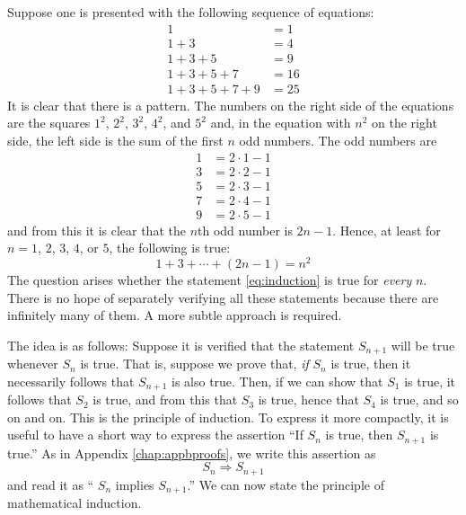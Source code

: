 
Suppose one is presented with the following sequence of equations:
\begin{align*}
1 &=1 \\
1 + 3 &=4 \\
1 + 3 + 5 &=9 \\
1 + 3 + 5 + 7 &=16 \\
1 + 3 + 5 + 7 + 9 &=25 
\end{align*}
It is clear that there is a pattern. The numbers on the right side of the equations are the squares $1^{2}$, $2^{2}$, $3^{2}$, $4^{2}$, and $5^{2}$ and, in the equation with $n^{2}$ on the right side, the left side is the sum of the first $n$ odd numbers. The odd numbers are
\begin{align*}
1 &= 2 \cdot 1 -1 \\
3 &= 2 \cdot 2 -1 \\
5 &= 2 \cdot 3 -1 \\
7 &= 2 \cdot 4 -1 \\
9 &= 2 \cdot 5 -1
\end{align*}
and from this it is clear that the $n$th odd number is $2n - 1$. Hence, at least for $n = 1$, $2$, $3$, $4$, or $5$, the following is true:
\begin{equation}\label{eq:induction}
1 + 3 + \cdots + (2n-1) = n^2 \tag{$S_n$}
\end{equation}
The question arises whether the statement \ref{eq:induction} is true for \textit{every} $n$.
 There is no hope of separately verifying all these statements because 
there are infinitely many of them. A more subtle approach is required.


The idea is as follows: Suppose it is verified that the statement $S_{n+1}$ will be true whenever $S_{n}$ is true. That is, suppose we prove that, \textit{if} $S_{n}$ is true, then it necessarily follows that $S_{n+1}$ is also true. Then, if we can show that $S_{1}$ is true, it follows that $S_{2}$ is true, and from this that $S_{3}$ is true, hence that $S_{4}$
 is true, and so on and on. This is the principle of induction. To 
express it more compactly, it is useful to have a short way to express 
the assertion ``If $S_{n}$ is true, then $S_{n+1}$ is true.'' As in Appendix \ref{chap:appbproofs}, we write this assertion as
\begin{equation*}
S_n \Rightarrow S_{n+1}
\end{equation*}
and read it as `` $S_{n}$ implies $S_{n+1}$.'' We can now state the principle of mathematical induction.

